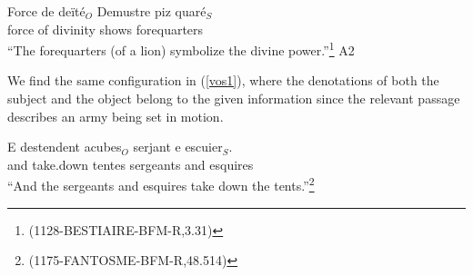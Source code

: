\documentclass[output=paper,modfonts,nonflat]{langsci/langscibook}
\begin{document}
\ea
\gll Force de de\"{i}t\'{e}$_{O}$ Demustre {piz quar\'{e}}$_{S}$\\
force of divinity shows forequarters \\
\glt ``The forequarters (of a lion) symbolize the divine power.''\footnote{\scriptsize{(1128-BESTIAIRE-BFM-R,3.31)}}\label{ovs3} \hfill A2
\z

We find the same configuration in (\ref{vos1}), where the denotations of both the subject and the object belong to the given information since the relevant passage describes an army being set in motion.

\ea
\gll E destendent acubes$_{O}$ serjant e escuier$_{S}$.\\
and take.down tentes sergeants and esquires\\
\glt ``And the sergeants and esquires take down the tents.''\footnote{\scriptsize{(1175-FANTOSME-BFM-R,48.514)}} \hfill \label{vos1}
\z




\end{document}
